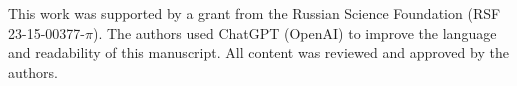 This work was supported by a grant from the Russian Science Foundation (RSF 23-15-00377-$\pi$). The authors used ChatGPT (OpenAI) to improve the language and readability of this manuscript. All content was reviewed and approved by the authors.
